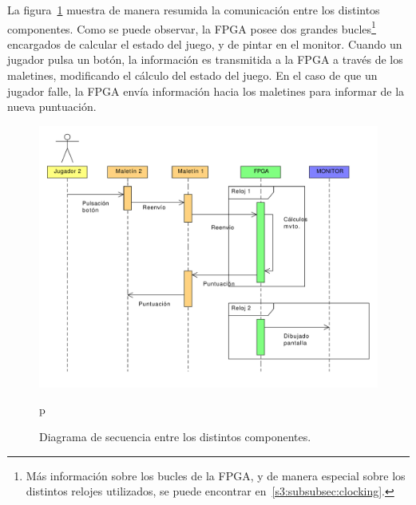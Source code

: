 La figura~\ref{s2:fig:secuencia} muestra de manera resumida la comunicación
entre los distintos componentes. Como se puede observar, la FPGA posee dos
grandes bucles\footnote{Más información sobre los bucles de la FPGA, y de
  manera especial sobre los distintos relojes utilizados, se puede encontrar
en~\ref{s3:subsubsec:clocking}.} encargados de calcular el estado del juego, y de pintar en
el monitor. Cuando un jugador pulsa un botón, la información es transmitida
a la FPGA a través de los maletines, modificando el cálculo del estado del
juego. En el caso de que un jugador falle, la FPGA envía información hacia
los maletines para informar de la nueva puntuación.

\begin{figure}[h]
  \centering
  \includegraphics[width=1.0\textwidth]{images/secuencia.pdf}
  \caption{Diagrama de secuencia entre los distintos componentes.}
  \label{s2:fig:secuencia}
p\end{figure}



%
%


